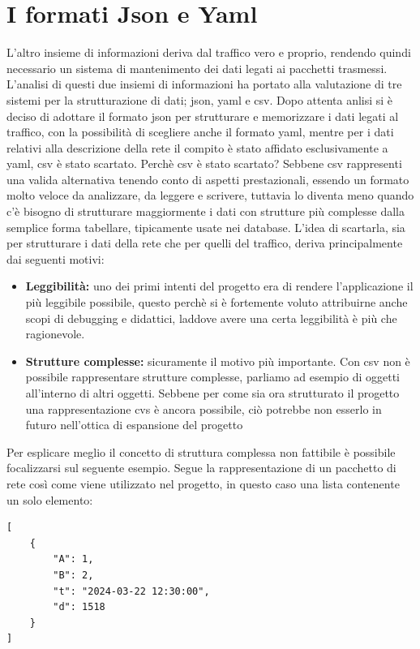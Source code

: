 \documentclass[binding=0.6cm]{sapthesis}
\begin{document}
\section{I formati Json e Yaml}
L'altro insieme di informazioni deriva dal traffico vero e proprio, rendendo quindi necessario un sistema di mantenimento dei dati legati ai pacchetti trasmessi. L'analisi di questi due insiemi di informazioni ha portato alla valutazione di tre sistemi per la strutturazione di dati; json\cite{RFC791}, yaml\cite{RFC9512} e csv\cite{RFC4180}.
Dopo attenta anlisi si è deciso di adottare il formato json per strutturare e memorizzare i dati legati al traffico, con la possibilità di scegliere anche il formato yaml, mentre per i dati relativi alla descrizione della rete il compito è stato affidato esclusivamente a yaml, csv è stato scartato.
Perchè csv è stato scartato? Sebbene csv rappresenti una valida alternativa tenendo conto di aspetti prestazionali, essendo un formato molto veloce da analizzare, da leggere e scrivere, tuttavia lo diventa meno quando c'è bisogno di strutturare maggiormente i dati con strutture più complesse dalla semplice forma tabellare, tipicamente usate nei database. 
L'idea di scartarla, sia per strutturare i dati della rete che per quelli del traffico, deriva principalmente dai seguenti motivi:

\begin{itemize}
    \item \textbf{Leggibilità:} uno dei primi intenti del progetto era di rendere l'applicazione il più leggibile possibile, questo perchè si è
    fortemente voluto attribuirne anche scopi di debugging e didattici, laddove avere una certa leggibilità è più che ragionevole.
    \item \textbf{Strutture complesse:} sicuramente il motivo più importante. Con csv non è possibile rappresentare strutture complesse, parliamo ad esempio di oggetti
    all'interno di altri oggetti. Sebbene per come sia ora strutturato il progetto una rappresentazione cvs è ancora possibile, ciò potrebbe non esserlo in futuro
    nell'ottica di espansione del progetto
\end{itemize}
Per esplicare meglio il concetto di struttura complessa non fattibile è possibile focalizzarsi
 sul seguente esempio. Segue la rappresentazione di un pacchetto di rete così come viene
 utilizzato nel progetto, in questo caso una lista contenente un solo elemento:

 {\scriptsize %
\begin{lstlisting}[caption={pacchetto di rete rappresentato in json}, label={fig:packet_example}]
[    
    {
        "A": 1,
        "B": 2,
        "t": "2024-03-22 12:30:00",
        "d": 1518
    }
]
\end{lstlisting}
 }
\end{document}
